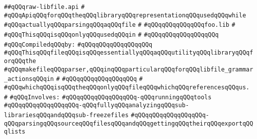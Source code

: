 \label{src/app/makelib/stuff/raw-libfile.api}
\verb|##qQQqraw-libfile.api|\newline
\verb|#|\newline
\verb|#qQQqApiqQQqforqQQqtheqQQqlibraryqQQqrepresentationqQQqusedqQQqwhile|\newline
\verb|#qQQqactuallyqQQqparsingqQQqaqQQqfile|\newline
\verb|#|\newline
\verb|#qQQqqQQqqQQqqQQqfoo.lib|\newline
\verb|#|\newline
\verb|#qQQqThisqQQqisqQQqonlyqQQqusedqQQqin|\newline
\verb|#|\newline
\verb|#qQQqqQQqqQQqqQQqqQQq|\newline
\newline
\verb|#qQQqCompiledqQQqby:|\newline
\verb|#qQQqqQQqqQQqqQQqqQQq|\newline
\newline
\newline
\newline
\verb|#qQQqThisqQQqfileqQQqisqQQqessentiallyqQQqaqQQqutilityqQQqlibraryqQQqforqQQqthe|\newline
\verb|#qQQqmakefileqQQqparser,qQQqinqQQqparticularqQQqforqQQqlibfile_grammar_actionsqQQqin|\newline
\verb|#|\newline
\verb|#qQQqqQQqqQQqqQQqqQQq|\newline
\verb|#|\newline
\verb|#qQQqwhichqQQqisqQQqtheqQQqonlyqQQqfileqQQqwhichqQQqreferencesqQQqus.|\newline
\verb|#|\newline
\verb|#qQQqInvolves:|\newline
\verb|#qQQqqQQqqQQqqQQqqQQq-qQQqrunningqQQqtools|\newline
\verb|#qQQqqQQqqQQqqQQqqQQq-qQQqfullyqQQqanalyzingqQQqsub-librariesqQQqandqQQqsub-freezefiles|\newline
\verb|#qQQqqQQqqQQqqQQqqQQq-qQQqparsingqQQqsourceqQQqfilesqQQqandqQQqgettingqQQqtheirqQQqexportqQQqlists|\newline
\newline
